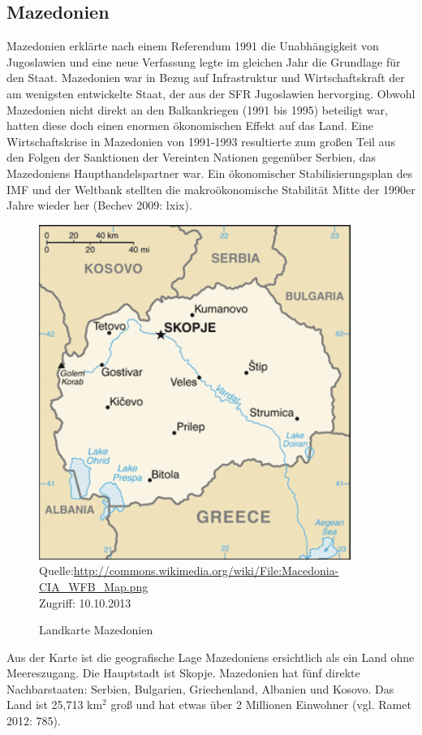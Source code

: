 \subsection{Mazedonien} 
Mazedonien erklärte nach einem Referendum 1991 die Unabhängigkeit von Jugoslawien und eine neue Verfassung legte im gleichen Jahr die Grundlage für den Staat. Mazedonien war in Bezug auf Infrastruktur und Wirtschaftskraft der am wenigsten entwickelte Staat, der aus der SFR Jugoslawien hervorging. Obwohl Mazedonien nicht direkt an den Balkankriegen (1991 bis 1995) beteiligt war, hatten diese doch einen enormen ökonomischen Effekt auf das Land. Eine Wirtschaftskrise in Mazedonien von 1991-1993 resultierte zum großen Teil aus den Folgen der Sanktionen der Vereinten Nationen gegenüber Serbien, das Mazedoniens Haupthandelspartner war. Ein ökonomischer Stabilisierungsplan des IMF und der Weltbank stellten die makroökonomische Stabilität Mitte der 1990er Jahre wieder her (Bechev 2009: lxix). 
\begin{figure}[H]
 \caption{Landkarte Mazedonien}
  \centering
  \includegraphics[width=4in]{Material/Macedonia-CIA_WFB_Map}\\
 \scriptsize{Quelle:\url{http://commons.wikimedia.org/wiki/File:Macedonia-CIA_WFB_Map.png}\\ Zugriff: 10.10.2013}
\end{figure}

Aus der Karte ist die geografische Lage Mazedoniens ersichtlich als ein Land ohne Meereszugang. Die Hauptstadt ist Skopje. Mazedonien hat fünf direkte Nachbarstaaten: Serbien, Bulgarien, Griechenland, Albanien und Kosovo. Das Land ist 25,713 km$^2$ groß und hat etwas über 2 Millionen Einwohner (vgl. Ramet 2012: 785). 

